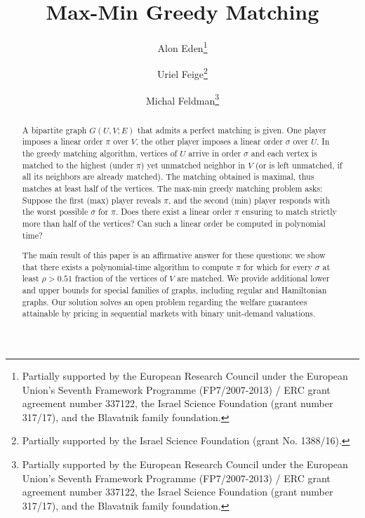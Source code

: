 \documentclass{toc}
\theoremstyle{plain}
\begin{document}
\begin{frontmatter} %
  
%
%

%
%

\title{Max-Min Greedy Matching}

%
%
%
%
%
%
%
%
%
%
%
%


%
%
%
%

%

\author[eden]{Alon Eden\thanks{Partially supported by the European Research Council under the European Union's Seventh Framework Programme (FP7/2007-2013) / ERC grant agreement number 337122, the Israel Science Foundation (grant number 317/17), and the Blavatnik family foundation.}}
\author[feige]{Uriel Feige\thanks{Partially supported by the Israel Science Foundation (grant No. 1388/16).}}
\author[feldman]{Michal Feldman\thanks{Partially supported by the European Research Council under the European Union's Seventh Framework Programme (FP7/2007-2013) / ERC grant agreement number 337122, the Israel Science Foundation (grant number 317/17), and the Blavatnik family foundation.}}


%

%
%
%
%
%
%
\begin{abstract}
	A bipartite graph $G(U,V;E)$ that admits a perfect matching is given.
	One player imposes a linear order $\pi$ over $V$, the other player imposes a linear order $\sigma$ over $U$.
	In the greedy matching algorithm, vertices of $U$ arrive in order $\sigma$ and each vertex is matched to the highest (under $\pi$) yet unmatched neighbor in $V$ (or
is  %
left unmatched, if all its neighbors are already matched).
%
The matching obtained   %
is maximal, thus matches at least %
half of the vertices.
The max-min greedy matching problem asks: %
Suppose  %
the first (max) player reveals $\pi$, and the second (min) player responds with the worst possible $\sigma$ for $\pi$. %
Does %
there exist a linear order $\pi$ ensuring to match 
strictly more than %
half of the vertices? Can such a linear order be computed in polynomial time?

	The main result of this paper is an affirmative answer for these questions: we show that there exists a 
%
polynomial-time  %
algorithm to compute $\pi$ for which for every $\sigma$ at least $\rho > 0.51$ fraction of the vertices of $V$ are matched.
	We provide additional lower and upper bounds for special families of graphs, including regular and Hamiltonian graphs.
	Our solution solves an open problem regarding the welfare guarantees attainable by pricing in sequential markets with binary unit-demand valuations.
\end{abstract}

%

\end{frontmatter}
\end{document}
